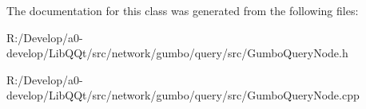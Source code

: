 The documentation for this class was generated from the following files\+:\begin{DoxyCompactItemize}
\item 
R\+:/\+Develop/a0-\/develop/\+Lib\+Q\+Qt/src/network/gumbo/query/src/Gumbo\+Query\+Node.\+h\item 
R\+:/\+Develop/a0-\/develop/\+Lib\+Q\+Qt/src/network/gumbo/query/src/Gumbo\+Query\+Node.\+cpp\end{DoxyCompactItemize}
